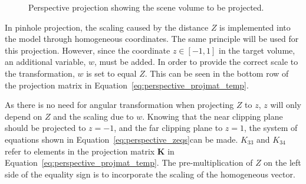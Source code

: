 \begin{figure}[!htb]
    \caption{Perspective projection showing the scene volume to be projected.}
    \label{fig:theory_perspective_projection_volume}
\end{figure}

In pinhole projection, the scaling caused by the distance $Z$ is implemented into the model through homogeneous coordinates. The same principle will be used for this projection. However, since the coordinate $z \in [-1,1]$ in the target volume, an additional variable, $w$, must be added. In order to provide the correct scale to the transformation, $w$ is set to equal $Z$. This can be seen in the bottom row of the projection matrix in Equation~\eqref{eq:perspective_projmat_temp}.

As there is no need for angular transformation when projecting $Z$ to $z$, $z$ will only depend on $Z$ and the scaling due to $w$. Knowing that the near clipping plane should be projected to $z=-1$, and the far clipping plane to $z=1$, the system of equations shown in Equation~\eqref{eq:perspective_zeqs}can be made. $K_{33}$ and $K_{34}$ refer to elements in the projection matrix $\mathbf{K}$ in Equation~\eqref{eq:perspective_projmat_temp}. The pre-multiplication of $Z$ on the left side of the equality sign is to incorporate the scaling of the homogeneous vector.

